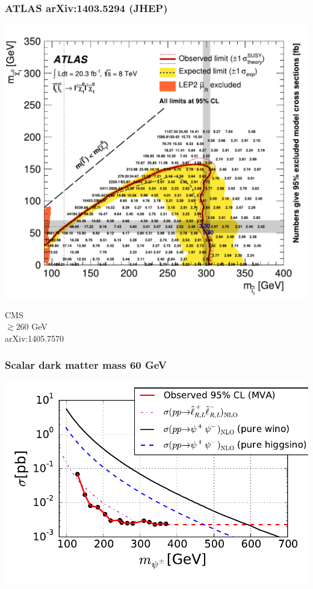 \documentclass[%
xcolor=dvipsnames,table%
]{beamer}
\begin{document}
\begin{frame}
  \frametitle{ATLAS arXiv:1403.5294 (JHEP)}
  \includegraphics[scale=0.46]{figaux_20b} 
\parbox[b]{3cm}{
CMS\\
$\gtrsim 260$ GeV\\
arXiv:1405.7570 
}
\end{frame}

\begin{frame}
\frametitle{Scalar dark matter mass 60 GeV}
  \includegraphics[scale=0.6]{emuMVA}
\end{frame}
\end{document}
